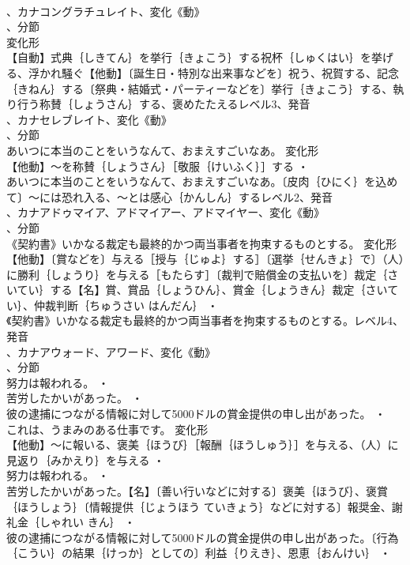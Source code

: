 \documentclass[8pt]{extreport}
\begin{document}
\begin{CJK}{UTF8}{min}
\\	、カナコングラチュレイト、変化《動》
\\	、分節
\\	変化形 
\\	【自動】式典｛しきてん｝を挙行｛きょこう｝する祝杯｛しゅくはい｝を挙げる、浮かれ騒ぐ【他動】〔誕生日・特別な出来事などを〕祝う、祝賀する、記念｛きねん｝する〔祭典・結婚式・パーティーなどを〕挙行｛きょこう｝する、執り行う称賛｛しょうさん｝する、褒めたたえるレベル3、発音
\\	、カナセレブレイト、変化《動》
\\	、分節
\\	あいつに本当のことをいうなんて、おまえすごいなあ。	変化形 
\\	【他動】～を称賛｛しょうさん｝［敬服｛けいふく｝］する ・
\\	あいつに本当のことをいうなんて、おまえすごいなあ。〔皮肉｛ひにく｝を込めて〕～には恐れ入る、～とは感心｛かんしん｝するレベル2、発音
\\	、カナアドゥマイア、アドマイアー、アドマイヤー、変化《動》
\\	、分節
\\	《契約書》いかなる裁定も最終的かつ両当事者を拘束するものとする。	変化形 
\\	【他動】〔賞などを〕与える［授与｛じゅよ｝する］〔選挙｛せんきょ｝で〕（人）に勝利｛しょうり｝を与える［もたらす］〔裁判で賠償金の支払いを〕裁定｛さいてい｝する【名】賞、賞品｛しょうひん｝、賞金｛しょうきん｝裁定｛さいてい｝、仲裁判断｛ちゅうさい はんだん｝ ・
\\	《契約書》いかなる裁定も最終的かつ両当事者を拘束するものとする。レベル4、発音
\\	、カナアウォード、アワード、変化《動》
\\	、分節
\\	努力は報われる。 ・
\\	苦労したかいがあった。 ・
\\	彼の逮捕につながる情報に対して5000ドルの賞金提供の申し出があった。 ・
\\	これは、うまみのある仕事です。	変化形 
\\	【他動】～に報いる、褒美｛ほうび｝［報酬｛ほうしゅう｝］を与える、（人）に見返り｛みかえり｝を与える ・
\\	努力は報われる。 ・
\\	苦労したかいがあった。【名】〔善い行いなどに対する〕褒美｛ほうび｝、褒賞｛ほうしょう｝〔情報提供｛じょうほう ていきょう｝などに対する〕報奨金、謝礼金｛しゃれい きん｝ ・
\\	彼の逮捕につながる情報に対して5000ドルの賞金提供の申し出があった。〔行為｛こうい｝の結果｛けっか｝としての〕利益｛りえき｝、恩恵｛おんけい｝ ・

\end{CJK}
\end{document}

